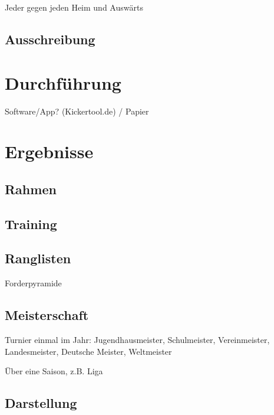Jeder gegen jeden
Heim und Auswärts


\subsection{Ausschreibung}
\label{turniere:vorbereitung:ausschreibung}

\section{Durchführung}
Software/App? (Kickertool.de) / Papier
\label{turniere:durchfuehrung}


\section{Ergebnisse}
\label{turniere:ergebnisse}

\subsection{Rahmen}
\label{turniere:ergebnisse:rahmen}

\subsection{Training}
\label{turniere:ergebnisse:rahmen:training}

\subsection{Ranglisten}
\label{turniere:ergebnisse:rahmen:rangliste}
Forderpyramide

\subsection{Meisterschaft}
\label{turniere:ergebnisse:rahmen:meisterschaft}

Turnier einmal im Jahr: Jugendhausmeister, Schulmeister, Vereinmeister, Landesmeister, Deutsche Meister, Weltmeister

Über eine Saison, z.B. Liga


\subsection{Darstellung}
\label{turniere:ergebnisse:formate}


